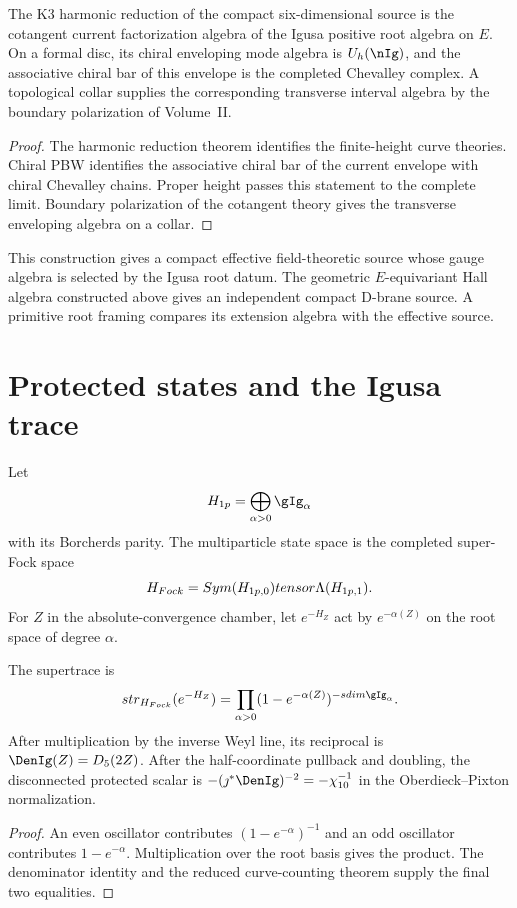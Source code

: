 \begin{corollary}
The K3 harmonic reduction of the compact six-dimensional source is the cotangent current factorization algebra of the Igusa positive root algebra on $E$.  On a formal disc, its chiral enveloping mode algebra is $\widehat U_h(\nIg)$, and the associative chiral bar of this envelope is the completed Chevalley complex.  A topological collar supplies the corresponding transverse interval algebra by the boundary polarization of Volume~II.
\end{corollary}
\begin{proof}
The harmonic reduction theorem identifies the finite-height curve theories.  Chiral PBW identifies the associative chiral bar of the current envelope with chiral Chevalley chains.  Proper height passes this statement to the complete limit.  Boundary polarization of the cotangent theory gives the transverse enveloping algebra on a collar.
\end{proof}

This construction gives a compact effective field-theoretic source whose gauge algebra is selected by the Igusa root datum.  The geometric $E$-equivariant Hall algebra constructed above gives an independent compact D-brane source.  A primitive root framing compares its extension algebra with the effective source.

\chapter{Protected states and the Igusa trace}
Let
\[
 \mathcal H_{\mathrm{1p}}
 =\widehat\bigoplus_{\alpha>0}\gIg_\alpha
\]
with its Borcherds parity.  The multiparticle state space is the completed super-Fock space
\[
 H_{Fock}=Sym(H_{1p,0})
 tensor\Lambda(H_{1p,1}).
\]
For $Z$ in the absolute-convergence chamber, let $e^{-H_Z}$ act by $e^{-\alpha(Z)}$ on the root space of degree $\alpha$.

\begin{theorem}
The supertrace is
\[
 \str_{\mathcal H_{\mathrm{Fock}}}(e^{-H_Z})
 =\prod_{\alpha>0}
 (1-e^{-\alpha(Z)})^{-\sdim\gIg_\alpha}.
\]
After multiplication by the inverse Weyl line, its reciprocal is $\DenIg(Z)=D_5(2Z)$.  After the half-coordinate pullback and doubling, the disconnected protected scalar is $-(\jmath^*\DenIg)^{-2}=-\chi_{10}^{-1}$ in the Oberdieck--Pixton normalization.
\end{theorem}
\begin{proof}
An even oscillator contributes $(1-e^{-\alpha})^{-1}$ and an odd oscillator contributes $1-e^{-\alpha}$.  Multiplication over the root basis gives the product.  The denominator identity and the reduced curve-counting theorem supply the final two equalities.
\end{proof}

